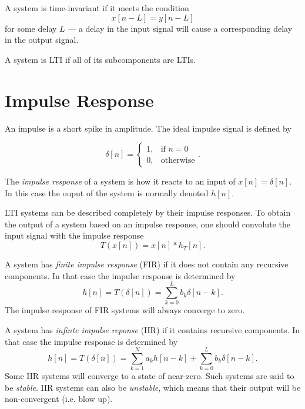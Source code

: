 \documentclass[openany]{book}
\def\lsqb{\left[}
\def\rsqb{\right]}
\def\sqb#1{\lsqb #1 \rsqb}
\def\xsig{x\sqb{n}}
\begin{document}
A system is time-invariant if it meets the condition
\begin{equation}
    x\sqb{n - L} = y\sqb{n - L}
\end{equation}
for some delay $L$ --- a delay in the input signal will cause a corresponding delay in the output signal.

A system is LTI if all of its subcomponents are LTIs.

\section{Impulse Response}
An impulse is a short spike in amplitude. The ideal impulse signal is defined by

\begin{equation}
    \delta\sqb{n} =
        \begin{cases}
            1, & \text{if } n = 0 \\
            0, & \text{otherwise}
        \end{cases}.
\end{equation}

The \textit{impulse response} of a system is how it reacts to an input of $\xsig = \delta\sqb{n}$. In this
case the ouput of the system is normally denoted $h\sqb{n}$.

LTI systems can be described completely by their impulse responses. To obtain the output of a system based on an impulse response, one should convolute the input signal with the impulse response
\begin{equation}
    T(\xsig) = \xsig * h_T\sqb{n}.
\end{equation}

A system has \textit{finite impulse response} (FIR) if it does not contain any recursive components. In that case the impulse response is determined by
\begin{equation}
    h\sqb{n} = T(\delta\sqb{n}) = \sum_{k = 0}^L b_k \delta\sqb{n - k}.
\end{equation}
The impulse response of FIR systems will always converge to zero.

A system has \textit{infinte impulse reponse} (IIR) if it contains recursive components. In that case the impulse response is determined by
\begin{equation}
    h\sqb{n} = T(\delta\sqb{n}) = \sum_{k=1}^N a_k h\sqb{n - k} + \sum_{k = 0}^L b_k \delta\sqb{n - k}.
\end{equation}
Some IIR systems will converge to a state of near-zero. Such systems are said to be \textit{stable}. IIR systems can also be \textit{unstable}, which means that their output will be non-convergent (i.e. blow up).
\end{document}
